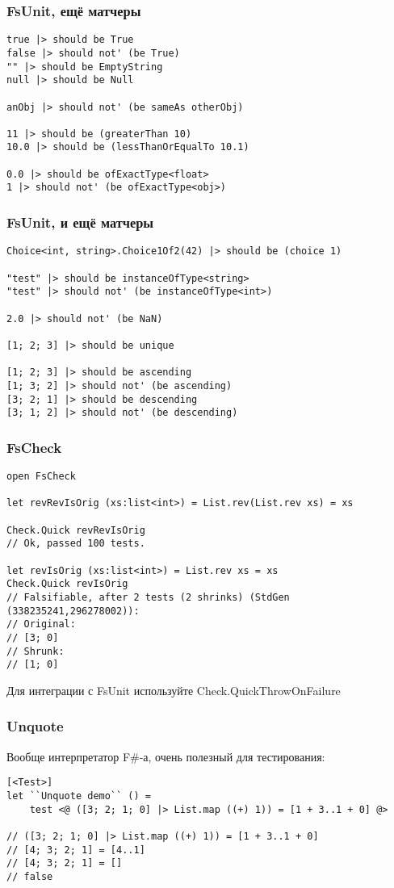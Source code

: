 \documentclass[xetex,mathserif,serif]{beamer}
\begin{document}
    \begin{frame}[fragile]
        \frametitle{FsUnit, ещё матчеры}
        \begin{verbatim}
true |> should be True
false |> should not' (be True)
"" |> should be EmptyString
null |> should be Null

anObj |> should not' (be sameAs otherObj)

11 |> should be (greaterThan 10)
10.0 |> should be (lessThanOrEqualTo 10.1)

0.0 |> should be ofExactType<float>
1 |> should not' (be ofExactType<obj>)
        \end{verbatim}
    \end{frame}

    \begin{frame}[fragile]
        \frametitle{FsUnit, и ещё матчеры}
        \begin{verbatim}
Choice<int, string>.Choice1Of2(42) |> should be (choice 1)

"test" |> should be instanceOfType<string>
"test" |> should not' (be instanceOfType<int>)

2.0 |> should not' (be NaN)

[1; 2; 3] |> should be unique

[1; 2; 3] |> should be ascending
[1; 3; 2] |> should not' (be ascending)
[3; 2; 1] |> should be descending
[3; 1; 2] |> should not' (be descending)
        \end{verbatim}
    \end{frame}

    \begin{frame}[fragile]
        \frametitle{FsCheck}
        \begin{verbatim}
open FsCheck

let revRevIsOrig (xs:list<int>) = List.rev(List.rev xs) = xs

Check.Quick revRevIsOrig
// Ok, passed 100 tests.

let revIsOrig (xs:list<int>) = List.rev xs = xs
Check.Quick revIsOrig
// Falsifiable, after 2 tests (2 shrinks) (StdGen (338235241,296278002)):
// Original:
// [3; 0]
// Shrunk:
// [1; 0]
        \end{verbatim}
        Для интеграции с FsUnit используйте Check.QuickThrowOnFailure
    \end{frame}

    \begin{frame}[fragile]
        \frametitle{Unquote}
        Вообще интерпретатор F\#-а, очень полезный для тестирования:
        \begin{verbatim}
[<Test>]
let ``Unquote demo`` () =
    test <@ ([3; 2; 1; 0] |> List.map ((+) 1)) = [1 + 3..1 + 0] @>

// ([3; 2; 1; 0] |> List.map ((+) 1)) = [1 + 3..1 + 0]
// [4; 3; 2; 1] = [4..1]
// [4; 3; 2; 1] = []
// false
        \end{verbatim}
    \end{frame}
\end{document}
